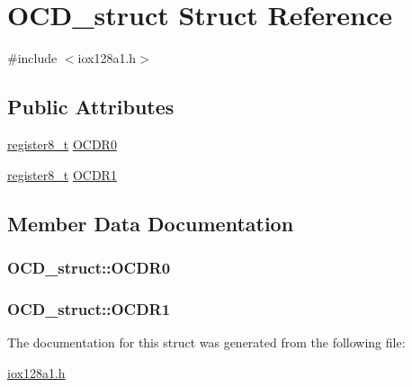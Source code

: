 \hypertarget{struct_o_c_d__struct}{
\section{OCD\_\-struct Struct Reference}
\label{struct_o_c_d__struct}
}


{\ttfamily \#include $<$iox128a1.h$>$}

\subsection*{Public Attributes}
\begin{DoxyCompactItemize}
\item 
\hyperlink{iox128a1_8h_a6a0649252b392263406882923b04a9db}{register8\_\-t} \hyperlink{struct_o_c_d__struct_a7d78bebb724b62f43ebcc014107e18a7}{OCDR0}
\item 
\hyperlink{iox128a1_8h_a6a0649252b392263406882923b04a9db}{register8\_\-t} \hyperlink{struct_o_c_d__struct_a187534bab951c099f10bbc0fecbdbef1}{OCDR1}
\end{DoxyCompactItemize}


\subsection{Member Data Documentation}
\hypertarget{struct_o_c_d__struct_a7d78bebb724b62f43ebcc014107e18a7}{
\subsubsection[{OCDR0}]{ {\bf OCD\_\-struct::OCDR0}}}
\label{struct_o_c_d__struct_a7d78bebb724b62f43ebcc014107e18a7}
\hypertarget{struct_o_c_d__struct_a187534bab951c099f10bbc0fecbdbef1}{
\subsubsection[{OCDR1}]{ {\bf OCD\_\-struct::OCDR1}}}
\label{struct_o_c_d__struct_a187534bab951c099f10bbc0fecbdbef1}


The documentation for this struct was generated from the following file:\begin{DoxyCompactItemize}
\item 
\hyperlink{iox128a1_8h}{iox128a1.h}\end{DoxyCompactItemize}
